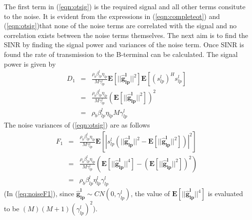 \documentclass[10pt, a4paper, twoside,fleqn]{article}
\begin{document}
The first term in (\ref{eqn:otsig}) is the required signal and all other terms consitute to the noise. It is evident from the expressions in (\ref{eqn:completeot}) and (\ref{eqn:otsig})that none of the noise terms are correlated with the signal and no correlation exists between the noise terms themselves.
The next aim is to find the SINR by finding the signal power and variances of the noise term. Once SINR is found the rate of transmission to the B-terminal can be calculated.
The signal power is given by
\begin{eqnarray}
	D_1 &=& \frac{\rho_b\beta_{lp}^{l}\eta_{lp}}{M\gamma_{lp}^{l}}\mathbf{E}[||\mathbf{\hat  g_{lp}^{l}}||^2]\mathbf{E}[(s_{lp}^{l})^Hs_{lp}^{l}] \nonumber \\
            &=& \frac{\rho_b\beta_{lp}^{l}\eta_{lp}}{M\gamma_{lp}^{l}}(\mathbf{E}[||\mathbf{\hat g_{lp}^{l}}||^2])^2 \nonumber \\
            &=& \rho_b\beta_{lp}^{l}\eta_{lp}M\gamma_{lp}^{l}
\end{eqnarray}
The noise variances of (\ref{eqn:otsig}) are as follows
\begin{eqnarray}\label{eq:noiseF1}
	F_1 &=& \frac{\rho_b \beta_{lp}^{l} \eta_{lp}}{M\gamma_{lp}^{l}}   \mathbf{E}[|s_{lp}^{l}\left(||\mathbf{\hat g_{lp}^{l}}||^2- \mathbf{E}[||\mathbf{\hat  g_{lp}^{l}}||^2] \right)|^2] \nonumber \\
	    &=& \frac{\rho_b \beta_{lp}^{l} \eta_{lp}}{M\gamma_{lp}^{l}}   \left(\mathbf{E}[||\mathbf{\hat g_{lp}^{l}}||^4] - (\mathbf{E}[||\mathbf{\hat g_{lp}^{l}}||^2])^2 \right) \nonumber  \\
	    &=& \rho_b\beta_{lp}^{l}\eta_{lp}^{l}\gamma_{lp}^{l}
\end{eqnarray}
(In (\ref{eq:noiseF1}), since $\mathbf{\hat g_{lp}^{l}} \sim CN(0,\gamma_{lp}^{l})$, the value of $\mathbf{E}[||\mathbf{\hat g_{lp}^{l}}||^4]$ is evaluated to be $(M)(M+1)(\gamma_{lp}^{l})^2$).
\end{document}
